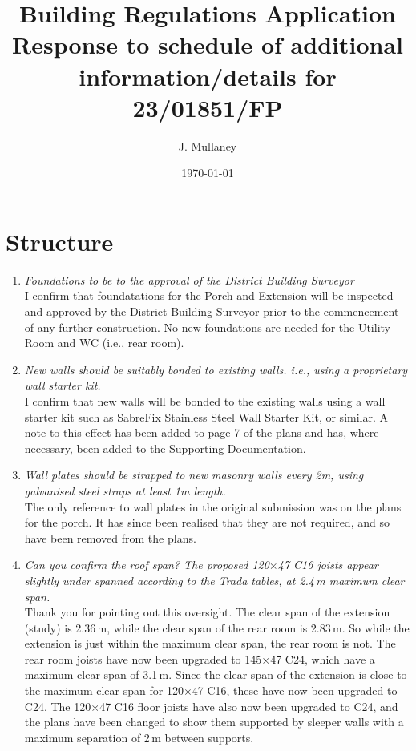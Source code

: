 \documentclass{extension}
\begin{document}
\title{Building Regulations Application \\[2mm]
Response to schedule of additional \\ information/details for 23/01851/FP}
\author{J. Mullaney}
\date{\today}

\maketitle

\vspace{5mm}

\section{Structure}
\begin{enumerate}
\item {\it Foundations to be to the approval of the District Building Surveyor}\\
I confirm that foundatations for the Porch and Extension will be inspected and approved by the District Building Surveyor prior to the commencement of any further construction. No new foundations are needed for the Utility Room and WC (i.e., rear room).
\item {\it New walls should be suitably bonded to existing walls. i.e., using a proprietary wall starter kit.}\\
I confirm that new walls will be bonded to the existing walls using a wall starter kit such as SabreFix Stainless Steel Wall Starter Kit, or similar.\cite{starterkit} A note to this effect has been added to page 7 of the plans and has, where necessary, been added to the Supporting Documentation.
\item {\it Wall plates should be strapped to new masonry walls every 2m, using galvanised steel straps at least 1m length.}\\
The only reference to wall plates in the original submission was on the plans for the porch. It has since been realised that they are not required, and so have been removed from the plans.
\item {\it Can you confirm the roof span? The proposed 120$\times$47 C16 joists appear slightly under spanned according to the Trada tables, at 2.4\,m maximum clear span.}\\
Thank you for pointing out this oversight. The clear span of the extension (study) is 2.36\,m, while the clear span of the rear room is 2.83\,m. So while the extension is just within the maximum clear span, the rear room is not. The rear room joists have now been upgraded to 145$\times$47 C24, which have a maximum clear span of 3.1\,m. Since the clear span of the extension is close to the maximum clear span for 120$\times$47 C16, these have now been upgraded to C24. The 120$\times$47 C16 floor joists have also now been upgraded to C24, and the plans have been changed to show them supported by sleeper walls with a maximum separation of 2\,m between supports.

\end{enumerate}
\end{document}

